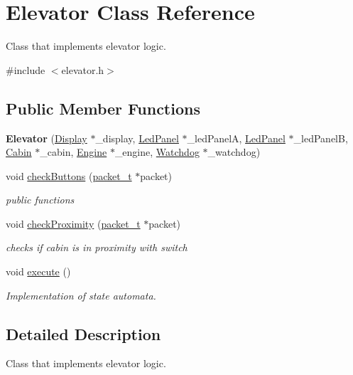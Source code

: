 \hypertarget{classElevator}{}\section{Elevator Class Reference}
\label{classElevator}


Class that implements elevator logic.  




{\ttfamily \#include $<$elevator.\+h$>$}

\subsection*{Public Member Functions}
\begin{DoxyCompactItemize}
\item 
\mbox{\label{classElevator_a5e3ab32dbd956fc98188afed5f35a1c0}} 
{\bfseries Elevator} (\hyperlink{classDisplay}{Display} $\ast$\+\_\+display, \hyperlink{classLedPanel}{Led\+Panel} $\ast$\+\_\+led\+PanelA, \hyperlink{classLedPanel}{Led\+Panel} $\ast$\+\_\+led\+PanelB, \hyperlink{classCabin}{Cabin} $\ast$\+\_\+cabin, \hyperlink{classEngine}{Engine} $\ast$\+\_\+engine, \hyperlink{classWatchdog}{Watchdog} $\ast$\+\_\+watchdog)
\item 
void \hyperlink{classElevator_afb7850243e1ef5093ecbe71c36fc2d77}{check\+Buttons} (\hyperlink{structpacket__t}{packet\+\_\+t} $\ast$packet)
\begin{DoxyCompactList}\small\item\em public functions \end{DoxyCompactList}\item 
void \hyperlink{classElevator_aa038b1485887ac34764de0b7e004f6be}{check\+Proximity} (\hyperlink{structpacket__t}{packet\+\_\+t} $\ast$packet)
\begin{DoxyCompactList}\small\item\em checks if cabin is in proximity with switch \end{DoxyCompactList}\item 
void \hyperlink{classElevator_abf9b96671aa49352be11ea2a33dcccb5}{execute} ()
\begin{DoxyCompactList}\small\item\em Implementation of state automata. \end{DoxyCompactList}\end{DoxyCompactItemize}


\subsection{Detailed Description}
Class that implements elevator logic. 

